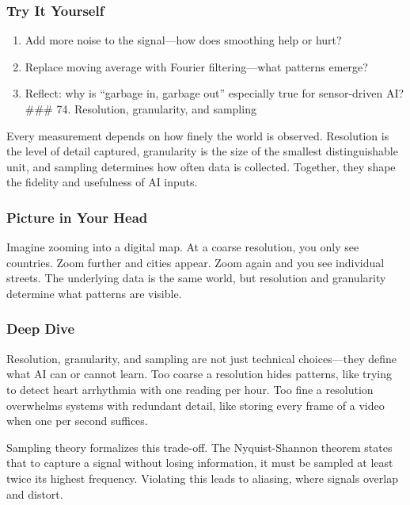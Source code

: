 \documentclass[
  letterpaper,
  DIV=11,
  numbers=noendperiod]{scrreprt}
\providecommand{\tightlist}{%
  \setlength{\itemsep}{0pt}\setlength{\parskip}{0pt}}
\begin{document}
\subsubsection{Try It Yourself}\label{try-it-yourself-72}

\begin{enumerate}
\def\labelenumi{\arabic{enumi}.}
\tightlist
\item
  Add more noise to the signal---how does smoothing help or hurt?
\item
  Replace moving average with Fourier filtering---what patterns emerge?
\item
  Reflect: why is ``garbage in, garbage out'' especially true for
  sensor-driven AI? \#\#\# 74. Resolution, granularity, and sampling
\end{enumerate}

Every measurement depends on how finely the world is observed.
Resolution is the level of detail captured, granularity is the size of
the smallest distinguishable unit, and sampling determines how often
data is collected. Together, they shape the fidelity and usefulness of
AI inputs.

\subsubsection{Picture in Your Head}\label{picture-in-your-head-73}

Imagine zooming into a digital map. At a coarse resolution, you only see
countries. Zoom further and cities appear. Zoom again and you see
individual streets. The underlying data is the same world, but
resolution and granularity determine what patterns are visible.

\subsubsection{Deep Dive}\label{deep-dive-73}

Resolution, granularity, and sampling are not just technical
choices---they define what AI can or cannot learn. Too coarse a
resolution hides patterns, like trying to detect heart arrhythmia with
one reading per hour. Too fine a resolution overwhelms systems with
redundant detail, like storing every frame of a video when one per
second suffices.

Sampling theory formalizes this trade-off. The Nyquist-Shannon theorem
states that to capture a signal without losing information, it must be
sampled at least twice its highest frequency. Violating this leads to
aliasing, where signals overlap and distort.
\end{document}
